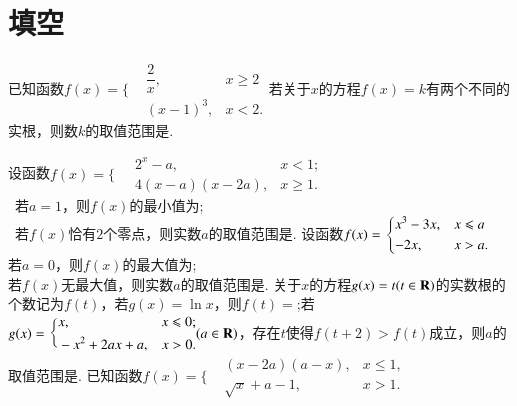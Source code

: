 \documentclass{BHCexam}
\begin{document}
\newpage
\section{填空}
\begin{questions}
\qs 已知函数$f(x)=\Bigg\{\begin{aligned}
&\dfrac{2}{x},&x\ge2\\
&(x-1)^3,&x<2.
\end{aligned}$若关于$ x $的方程$ f(x)=k $有两个不同的实根，则数$ k $的取值范围是\tk.

\qs
设函数$f(x)=\Bigg\{\begin{aligned}
&~2^x-a,& x<1;\\
&~4(x-a)(x-2a),& x\ge 1.
\end{aligned}$\\
~若$a=1$，则$ f(x) $的最小值为\tk;\\
~若$f(x) $恰有$ 2 $个零点，则实数$ a $的取值范围是\tk.
\qs 设函数$f(x)=\begin{dcases}
x^3-3x,&x\le a \\
-2x,&x>a.
\end{dcases}$\\
 若$ a=0 $，则$f(x)$的最大值为\tk;\\
 若$f(x)$无最大值，则实数$ a $的取值范围是\tk.
\qs 关于$ x $的方程$ g(x)=t(t\inR) $的实数根的个数记为$ f(t) $，若$g(x)=\ln x$，则$f(t)=$\tk;若$g(x)=\Bigg\{\begin{aligned}
&x,&x\le0;\\
&-x^2+2ax+a,&x>0.
\end{aligned}(a\inR)$，存在$ t $使得$ f(t+2)>f(t) $成立，则$ a $的取值范围是\tk.
\qs 已知函数$f(x)=\Bigg\{\begin{aligned}
&(x-2a)(a-x),&x\le 1,\\&\sqrt{x}+a-1,&x>1.
\end{aligned}$
\end{questions}
\end{document}

